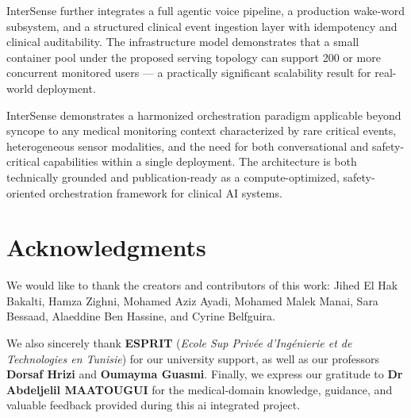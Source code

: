 \documentclass[11pt,a4paper]{article}
\begin{document}
InterSense further integrates a full agentic voice pipeline, a production wake-word subsystem, and a structured clinical event ingestion layer with idempotency and clinical auditability. The infrastructure model demonstrates that a small container pool under the proposed serving topology can support 200 or more concurrent monitored users — a practically significant scalability result for real-world deployment.

InterSense demonstrates a harmonized orchestration paradigm applicable beyond syncope to any medical monitoring context characterized by rare critical events, heterogeneous sensor modalities, and the need for both conversational and safety-critical capabilities within a single deployment. The architecture is both technically grounded and publication-ready as a compute-optimized, safety-oriented orchestration framework for clinical AI systems.

\section*{Acknowledgments}
We would like to thank the creators and contributors of this work: Jihed El Hak Bakalti, Hamza Zighni, Mohamed Aziz Ayadi, Mohamed Malek Manai, Sara Bessaad, Alaeddine Ben Hassine, and Cyrine Belfguira.

We also sincerely thank \textbf{ESPRIT} (\textit{Ecole Sup Priv\'ee d'Ing\'enierie et de Technologies en Tunisie}) for our university support, as well as our professors \textbf{Dorsaf Hrizi} and \textbf{Oumayma Guasmi}. Finally, we express our gratitude to \textbf{Dr Abdeljelil MAATOUGUI} for the medical-domain knowledge, guidance, and valuable feedback provided during this \gls{ai} integrated project.

\end{document}
